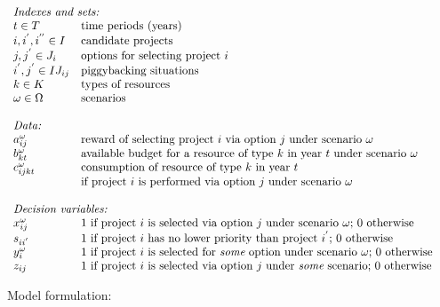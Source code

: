 \[
\begin{array}{ll}
\multicolumn{2}{l}{\mbox{\em Indexes and sets:} } \\
t \in T  & \mbox{time periods (years)} \\
i,i^{'}, i^{''} \in I  & \mbox{candidate projects} \\
j, j^{'} \in J_{i}	& \mbox{options for selecting project $i$} \\
i^{'},j^{'} \in IJ_{ij} & \mbox{piggybacking situations} \\
k \in K	& \mbox{types of resources} \\
\omega \in \Omega & \mbox{scenarios}\\
\\
\multicolumn{2}{l}{\mbox{\em Data:}} \\
a_{ij}^{\omega} & \mbox{reward of selecting project $i$ via option $j$ under scenario $\omega$}  \\
b_{kt}^{\omega} & \mbox{available budget for a resource of type $k$ in year $t$ under scenario $\omega$}\\
c_{ijkt}^{\omega} & \mbox{consumption of resource of type $k$ in year $t$ } \\
& \mbox{if project $i$ is performed via option $j$ under scenario $\omega$}\\
\\
\multicolumn{2}{l}{\mbox{\em Decision variables:}}  \\
x_{ij}^{\omega} & \mbox{1 if project $i$ is selected via option $j$ under scenario $\omega$; 0 otherwise} \hspace*{4.0in}\\
s_{ii^{'}} & \mbox{1 if project $i$ has no lower priority than project $i^{'}$; 0 otherwise} \hspace*{4.0in}\\
y_{i}^{\omega} & \mbox{1 if project $i$ is selected for {\it some} option under scenario $\omega$; 0 otherwise} \hspace*{4.0in}\\
z_{ij} & \mbox{1 if project $i$ is selected via option $j$ under {\it some} scenario; 0 otherwise} \hspace*{4.0in}\\
\end{array}
\]

Model formulation:\\

